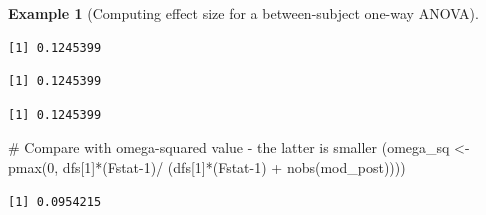 \documentclass[
  11pt,
  letterpaper,
]{scrbook}
\newenvironment{Shaded}{\begin{snugshade}}{\end{snugshade}}
\newcommand{\AttributeTok}[1]{\textcolor[rgb]{0.40,0.45,0.13}{#1}}
\newcommand{\CommentTok}[1]{\textcolor[rgb]{0.37,0.37,0.37}{#1}}
\newcommand{\ConstantTok}[1]{\textcolor[rgb]{0.56,0.35,0.01}{#1}}
\newcommand{\DecValTok}[1]{\textcolor[rgb]{0.68,0.00,0.00}{#1}}
\newcommand{\FunctionTok}[1]{\textcolor[rgb]{0.28,0.35,0.67}{#1}}
\newcommand{\NormalTok}[1]{\textcolor[rgb]{0.00,0.23,0.31}{#1}}
\newcommand{\OtherTok}[1]{\textcolor[rgb]{0.00,0.23,0.31}{#1}}
\newcommand{\SpecialCharTok}[1]{\textcolor[rgb]{0.37,0.37,0.37}{#1}}
\theoremstyle{definition}
\theoremstyle{definition}
\newtheorem{example}{Example}[chapter]
\theoremstyle{remark}
\begin{document}
\begin{example}[Computing effect size for a between-subject one-way
ANOVA]
\begin{verbatim}
[1] 0.1245399
\end{verbatim}

\begin{Shaded}
\end{Shaded}

\begin{verbatim}
[1] 0.1245399
\end{verbatim}

\begin{Shaded}
\end{Shaded}

\begin{verbatim}
[1] 0.1245399
\end{verbatim}

\begin{Shaded}
\begin{Highlighting}[]
\CommentTok{\# Compare with omega{-}squared value {-} the latter is smaller}
\NormalTok{(omega\_sq }\OtherTok{\textless{}{-}} \FunctionTok{pmax}\NormalTok{(}\DecValTok{0}\NormalTok{, dfs[}\DecValTok{1}\NormalTok{]}\SpecialCharTok{*}\NormalTok{(Fstat}\DecValTok{{-}1}\NormalTok{)}\SpecialCharTok{/}\NormalTok{ (dfs[}\DecValTok{1}\NormalTok{]}\SpecialCharTok{*}\NormalTok{(Fstat}\DecValTok{{-}1}\NormalTok{) }\SpecialCharTok{+} \FunctionTok{nobs}\NormalTok{(mod\_post))))}
\end{Highlighting}
\end{Shaded}

\begin{verbatim}
[1] 0.0954215
\end{verbatim}

\begin{Shaded}
\end{Shaded}


\end{example}
\end{document}
